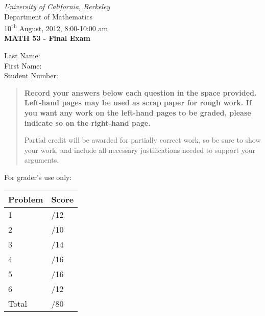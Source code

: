 \documentclass[12pt]{article}
\newcommand{\skipline}{\vspace{12pt}}
\begin{document}
\author{Instructor: Sean Fitzpatrick}
\thispagestyle{plain}
\begin{center}
\emph{University of California, Berkeley}\\
Department of Mathematics\\
10\textsuperscript{th} August, 2012, 8:00-10:00 am\\
{\bf MATH 53 - Final Exam}\\
\end{center}
\skipline \skipline \skipline \noindent \skipline
Last Name:\underline{\hspace{350pt}}\\
\skipline
First Name:\underline{\hspace{348pt}}\\
\skipline
Student Number:\underline{\hspace{322pt}}\\
\skipline


\vspace{0.5in}


\begin{quote}
 {\bf Record your answers below each question in the space provided.    Left-hand pages may be used as scrap paper for rough work.  If you want any work on the left-hand pages to be graded, please indicate so on the right-hand page.
 
 \bigskip
 
Partial credit will be awarded for partially correct work, so be sure to show your work, and include all necessary justifications needed to support your arguments.}
\end{quote}


\vspace{0.5in}

For grader's use only:

\begin{table}[hbt]
\begin{center}
\begin{tabular}{|l|l|} \hline
Problem&Score\\
\hline \hline
\cline{1-2} 1 & \enspace\enspace\enspace\enspace\enspace\enspace/12\\
\cline{1-2} 2 & \enspace\enspace\enspace\enspace\enspace\enspace/10\\
\cline{1-2} 3 & \enspace\enspace\enspace\enspace\enspace\enspace/14\\
\cline{1-2} 4 & \enspace\enspace\enspace\enspace\enspace\enspace/16\\
\cline{1-2} 5 & \enspace\enspace\enspace\enspace\enspace\enspace/16\\
\cline{1-2} 6 & \enspace\enspace\enspace\enspace\enspace\enspace/12\\
\cline{1-2} Total & \enspace\enspace\enspace\enspace\enspace\enspace/80\\
\hline
\end{tabular}
\end{center}
\end{table}
\newpage
\end{document}
